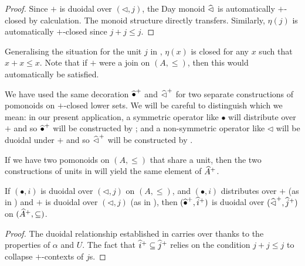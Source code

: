 \begin{proof}
  Since $+$ is duoidal over $(\lhd, j)$, the Day monoid $\mathop{\widehat{\lhd}}$
  is automatically $+$-closed by calculation. The monoid structure
  directly transfers. Similarly, $\eta(j)$ is automatically $+$-closed
  since $j + j \leq j$.
\end{proof}

\begin{remark}
  Generalising the situation for the unit $j$ in , $\eta(x)$ is closed for any $x$
  such that $x + x \leq x$. Note that if $+$ were a join on
  $(A, \leq)$, then this would automatically be satisfied.
\end{remark}

\begin{remark}
  We have used the same decoration $\mathop{\widehat{\bullet}^+}$ and
  $\mathop{\widehat{\lhd}^+}$ for two separate constructions of pomonoids on
  $+$-closed lower sets. We will be careful to distinguish which we
  mean: in our present application, a symmetric operator like
  $\bullet$ will distribute over $+$ and so $\mathop{\widehat{\bullet}^+}$ will
  be constructed by ; and
  a non-symmetric operator like $\lhd$ will be duoidal under $+$ and
  so $\mathop{\widehat{\lhd}^+}$ will be constructed by .
\end{remark}

\begin{remark}
  If we have two pomonoids on $(A, \leq)$ that share a unit, then the
  two constructions of units in  will yield the same element of
  $\widehat{A}^+$.
\end{remark}

\begin{proposition}
  If $(\bullet, i)$ is duoidal over $(\lhd, j)$ on $(A, \leq)$, and
  $(\bullet, i)$ distributes over $+$ (as in ) and $+$ is duoidal over
  $(\lhd, j)$ (as in ),
  then $(\mathop{\widehat{\bullet}^+}, \mathop{\widehat{i}^+})$ is duoidal over
  $(\mathop{\widehat{\lhd}^+}, \mathop{\widehat{j}^+})$ on
  $(\widehat{A}^+, \subseteq)$.
\end{proposition}

\begin{proof}
  The duoidal relationship established in  carries over thanks to the properties
  of $\alpha$ and $U$. The fact that
  $\mathop{\widehat{i}^+} \subseteq \mathop{\widehat{j}^+}$ relies on the condition
  $j + j \leq j$ to collapse $+$-contexts of $j$s.
\end{proof}

